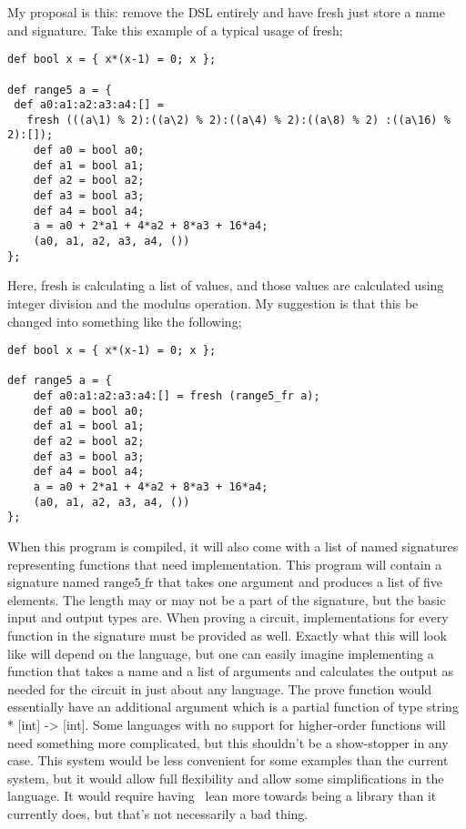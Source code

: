 \documentclass[
    9pt,            %
    techreport,        %
    affiltop,       %
]{art}
\begin{document}
My proposal is this: remove the DSL entirely and have fresh just store a name and signature. Take this example of a typical usage of fresh;


\begin{verbatim}
def bool x = { x*(x-1) = 0; x };

def range5 a = {
 def a0:a1:a2:a3:a4:[] =
   fresh (((a\1) % 2):((a\2) % 2):((a\4) % 2):((a\8) % 2) :((a\16) % 2):[]);
    def a0 = bool a0;
    def a1 = bool a1;
    def a2 = bool a2;
    def a3 = bool a3;
    def a4 = bool a4;
    a = a0 + 2*a1 + 4*a2 + 8*a3 + 16*a4;
    (a0, a1, a2, a3, a4, ())
};
\end{verbatim}

Here, fresh is calculating a list of values, and those values are calculated using integer division and the modulus operation. My suggestion is that this be changed into something like the following;

\begin{verbatim}
def bool x = { x*(x-1) = 0; x };

def range5 a = {
    def a0:a1:a2:a3:a4:[] = fresh (range5_fr a);
    def a0 = bool a0;
    def a1 = bool a1;
    def a2 = bool a2;
    def a3 = bool a3;
    def a4 = bool a4;
    a = a0 + 2*a1 + 4*a2 + 8*a3 + 16*a4;
    (a0, a1, a2, a3, a4, ())
};
\end{verbatim}

When this program is compiled, it will also come with a list of named signatures representing functions that need implementation. This program will contain a signature named $\text{range5\_fr}$ that takes one argument and produces a list of five elements. The length may or may not be a part of the signature, but the basic input and output types are. When proving a circuit, implementations for every function in the signature must be provided as well. Exactly what this will look like will depend on the language, but one can easily imagine implementing a function that takes a name and a list of arguments and calculates the output as needed for the circuit in just about any language. The prove function would essentially have an additional argument which is a partial function of type string * [int] -> [int]. Some languages with no support for higher-order functions will need something more complicated, but this shouldn't be a show-stopper in any case. This system would be less convenient for some examples than the current system, but it would allow full flexibility and allow some simplifications in the language. It would require having \VampIR{}\ lean more towards being a library than it currently does, but that's not necessarily a bad thing.
\end{document}
